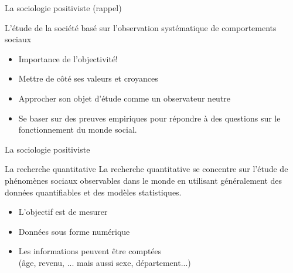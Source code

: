 \documentclass[10pt]{beamer}
\begin{document}
\begin{frame}{La sociologie positiviste (rappel)}
    \begin{block}{L'étude de la société basé sur l'observation systématique de comportements sociaux}
    \end{block}
    \begin{itemize}
        \item Importance de l'objectivité!
        \item Mettre de côté ses valeurs et croyances
        \item Approcher son objet d'étude comme un observateur neutre
        \item Se baser sur des preuves empiriques pour répondre à des questions sur le fonctionnement du monde social.
    \end{itemize}

\end{frame}

\begin{frame}{La sociologie positiviste}
    \begin{block}{La recherche quantitative}
        La recherche quantitative se concentre sur l'étude de phénomènes sociaux observables dans le monde en utilisant généralement des données quantifiables et des modèles statistiques.
    \begin{itemize}
        \item L'objectif est de mesurer
        \item Données sous forme numérique
        \item Les informations peuvent être comptées \\(âge, revenu, ... mais aussi sexe, département...)
    \end{itemize}
    \end{block}

\end{frame}
\end{document}
